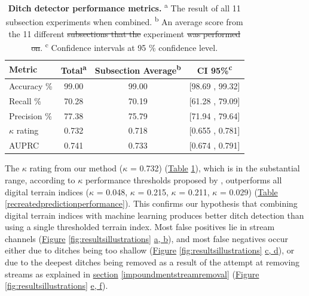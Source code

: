\documentclass[11pt, review]{elsarticle} %
\providecommand{\DIFaddtex}[1]{{\protect\color{blue}\uwave{#1}}} %
\providecommand{\DIFdeltex}[1]{{\protect\color{red}\sout{#1}}}                      %
\providecommand{\DIFaddFL}[1]{\DIFadd{#1}} %
\providecommand{\DIFdelFL}[1]{\DIFdel{#1}} %
\providecommand{\DIFaddbeginFL}{} %
\providecommand{\DIFaddendFL}{} %
\providecommand{\DIFdelbeginFL}{} %
\providecommand{\DIFdelendFL}{} %
\providecommand{\DIFadd}[1]{\texorpdfstring{\DIFaddtex{#1}}{#1}} %
\providecommand{\DIFdel}[1]{\texorpdfstring{\DIFdeltex{#1}}{}} %
\begin{document}
\begin{table}[!htb]
\centering
    {\begin{tabular}{lccc}
        \textbf{Metric} & \textbf{Total}\textsuperscript{a} & \textbf{Subsection Average}\textsuperscript{b}& \textbf{CI 95\%}\textsuperscript{c} \\ 
        \hline
        Accuracy     \% & 99.00 & 99.00 & [98.69 , 99.32] \\
        Recall       \% & 70.28 & 70.19 & [61.28 , 79.09] \\
        Precision    \% & 77.38 & 75.79 & [71.94 , 79.64] \\
        $\kappa$ rating & 0.732 & 0.718 & [0.655 , 0.781] \\
        AUPRC           & 0.741 & 0.733 & [0.674 , 0.791] \\
        \hline
    \end{tabular}}
    \caption{\textbf{Ditch detector performance metrics.} \newline
    \textsuperscript{a} The result of all 11 subsection experiments when combined. \newline
    \textsuperscript{b} An average score from the 11 different \DIFdelbeginFL \DIFdelFL{subsections that the }\DIFdelendFL experiment \DIFdelbeginFL \DIFdelFL{was performed on}\DIFdelendFL \DIFaddbeginFL \DIFaddFL{subsections}\DIFaddendFL . \newline
    \textsuperscript{c} Confidence intervals at 95 \% confidence level.}
    \label{predictionperformance}
\end{table}

The $\kappa$ rating from our method ($\kappa$ = 0.732) (\hyperref[predictionperformance]{Table} \ref{predictionperformance}), which is in the substantial range, according to $\kappa$ performance thresholds proposed by \citet{kappaanalysis}, outperforms all digital terrain indices ($\kappa$ = 0.048, $\kappa$ = 0.215, $\kappa$ = 0.211, $\kappa$ = 0.029) (\hyperref[recreatedpredictionperformance]{Table} \ref{recreatedpredictionperformance}). This confirms our hypothesis that combining digital terrain indices with machine learning produces better ditch detection than using a single thresholded terrain index. Most false positives lie in stream channels (\hyperref[fig:resultsillustrations]{Figure} \ref{fig:resultsillustrations} \hyperref[fig:resultsillustrations]{a, b}), and most false negatives occur either due to ditches being too shallow (\hyperref[fig:resultsillustrations]{Figure} \ref{fig:resultsillustrations} \hyperref[fig:resultsillustrations]{c, d}), or due to the deepest ditches being removed as a result of the attempt at removing streams as explained in \hyperref[impoundmentstreamremoval]{section} \ref{impoundmentstreamremoval} (\hyperref[fig:resultsillustrations]{Figure} \ref{fig:resultsillustrations} \hyperref[fig:resultsillustrations]{e, f}).
\end{document}
